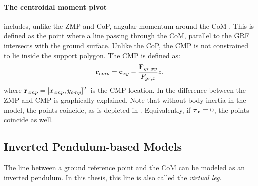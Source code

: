 \paragraph{The centroidal moment pivot} includes, unlike the \ac{ZMP} and \ac{CoP}, angular momentum around the \ac{CoM}  \cite{popovic2005ground}. This is defined as the point where a line passing through the \ac{CoM}, parallel to the \ac{GRF} intersects with the ground surface. Unlike the \ac{CoP}, the \ac{CMP} is not constrained to lie inside the support polygon. The \ac{CMP} is defined as:
\begin{equation}
    \mathbf{r}_{cmp}=\mathbf{c}_{xy}-\frac{\mathbf{F}_{gr,xy}}{F_{gr,z}}z,
    \label{eq:cmp}
\end{equation}
where $\mathbf{r}_{cmp} =[x_{cmp}, y_{cmp}]^T$ is the \ac{CMP} location. In  the difference between the \ac{ZMP} and \ac{CMP} is graphically explained. Note that without body inertia in the model, the points coincide, as is depicted in . Equivalently, if $\boldsymbol{\tau}_{\mathbf{c}}=0$, the points coincide as well.

\subsection{Inverted Pendulum-based Models}
The line between a ground reference point and the \ac{CoM} can be modeled as an inverted pendulum. In this thesis, this line is also called the \textit{virtual leg}.

